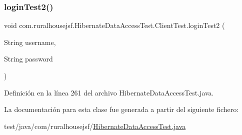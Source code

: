 \mbox{\label{a00276_a7ff9002a6599de1873e9ec87e7249c3f}} 
\subsubsection{\texorpdfstring{loginTest2()}{loginTest2()}}
{\footnotesize\ttfamily void com.\+ruralhousejsf.\+Hibernate\+Data\+Access\+Test.\+Client\+Test.\+login\+Test2 (\begin{DoxyParamCaption}\item[{String}]{username,  }\item[{String}]{password }\end{DoxyParamCaption})\hspace{0.3cm}{\ttfamily [package]}}



Definición en la línea 261 del archivo Hibernate\+Data\+Access\+Test.\+java.



La documentación para esta clase fue generada a partir del siguiente fichero\+:\begin{DoxyCompactItemize}
\item 
test/java/com/ruralhousejsf/\mbox{\hyperlink{a00101}{Hibernate\+Data\+Access\+Test.\+java}}\end{DoxyCompactItemize}
